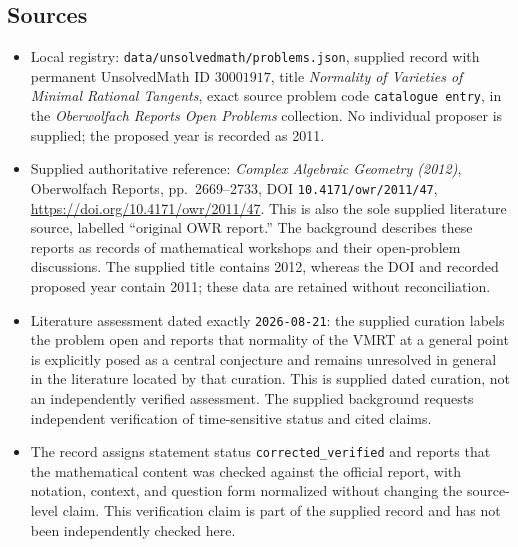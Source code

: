 \documentclass[11pt]{article}
\begin{document}
\subsection{Sources}
\begin{itemize}
\item Local registry: \texttt{data/unsolvedmath/problems.json}, supplied record with permanent UnsolvedMath ID \(30001917\), title \emph{Normality of Varieties of Minimal Rational Tangents}, exact source problem code \texttt{catalogue entry}, in the \emph{Oberwolfach Reports Open Problems} collection. No individual proposer is supplied; the proposed year is recorded as 2011.
\item Supplied authoritative reference: \emph{Complex Algebraic Geometry (2012)}, Oberwolfach Reports, pp.\ 2669--2733, DOI \texttt{10.4171/owr/2011/47}, \url{https://doi.org/10.4171/owr/2011/47}. This is also the sole supplied literature source, labelled ``original OWR report.'' The background describes these reports as records of mathematical workshops and their open-problem discussions. The supplied title contains 2012, whereas the DOI and recorded proposed year contain 2011; these data are retained without reconciliation.
\item Literature assessment dated exactly \texttt{2026-08-21}: the supplied curation labels the problem open and reports that normality of the VMRT at a general point is explicitly posed as a central conjecture and remains unresolved in general in the literature located by that curation. This is supplied dated curation, not an independently verified assessment. The supplied background requests independent verification of time-sensitive status and cited claims.
\item The record assigns statement status \texttt{corrected\_verified} and reports that the mathematical content was checked against the official report, with notation, context, and question form normalized without changing the source-level claim. This verification claim is part of the supplied record and has not been independently checked here.
\end{itemize}
\end{document}
